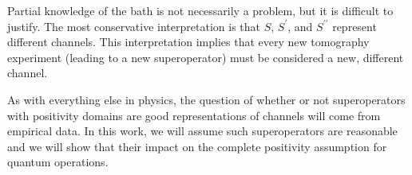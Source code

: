Partial knowledge of the bath is not necessarily a problem, but it is difficult to justify.  The most conservative interpretation is that $S$, $S^\prime$, and $S^{\prime\prime}$ represent different channels.  This interpretation implies that every new tomography experiment (leading to a new superoperator) must be considered a new, different channel.

As with everything else in physics, the question of whether or not superoperators with positivity domains are good representations of channels will come from empirical data.  In this work, we will assume such superoperators are reasonable and we will show that their impact on the complete positivity assumption for quantum operations.